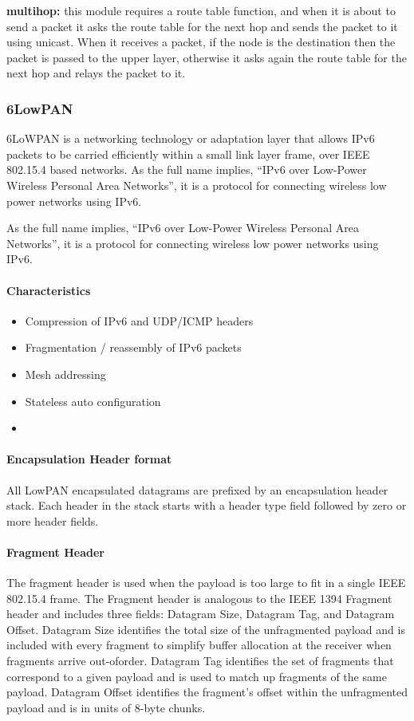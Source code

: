 \textbf{multihop:} this module requires a route table function,
	and when it is about to send a packet it asks the route table for the next hop and sends the packet to it using unicast.
When it receives a packet,
	if the node is the destination then the packet is passed to the upper layer,
	otherwise it asks again the route table for the next hop and relays the packet to it.

\subsubsection{6LowPAN}

6LoWPAN is a networking technology or adaptation layer that allows IPv6 packets to be carried efficiently within a small link layer frame,
	over IEEE 802.15.4 based networks.
As the full name implies,
	“IPv6 over Low-Power Wireless Personal Area Networks”,
	it is a protocol for connecting wireless low power networks using IPv6.

As the full name implies,
	“IPv6 over Low-Power Wireless Personal Area Networks”,
	it is a protocol for connecting wireless low power networks using IPv6.

\paragraph{Characteristics}

	\begin{itemize}
		\item Compression of IPv6 and UDP/ICMP headers
		\item Fragmentation / reassembly of IPv6 packets
		\item Mesh addressing
		\item Stateless auto configuration
		\item 
	\end{itemize}
	
\paragraph{Encapsulation Header format}
All LowPAN encapsulated datagrams are prefixed by an encapsulation header stack.
Each header in the stack starts with a header type field followed by zero or more header fields.

\paragraph{Fragment Header}
The fragment header is used when the payload is too large to fit in a single IEEE 802.15.4 frame.
The Fragment header is analogous to the IEEE 1394 Fragment header and includes three fields:
	Datagram Size,
	Datagram Tag,
	and Datagram Offset.
Datagram Size identifies the total size of the unfragmented payload and is included with every fragment to simplify buffer allocation at the receiver when fragments arrive out-oforder.
Datagram Tag identifies the set of fragments that correspond to a given payload and is used to match up fragments of the same payload.
Datagram Offset identifies the fragment’s offset within the unfragmented payload and is in units of 8-byte chunks.

